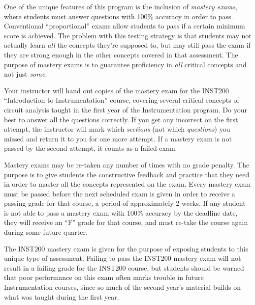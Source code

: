 

One of the unique features of this program is the inclusion of {\it mastery exams}, where students must answer questions with 100\% accuracy in order to pass.  Conventional ``proportional'' exams allow students to pass if a certain minimum score is achieved.  The problem with this testing strategy is that students may not actually learn {\it all} the concepts they're supposed to, but may still pass the exam if they are strong enough in the other concepts covered in that assessment.  The purpose of mastery exams is to guarantee proficiency in {\it all} critical concepts and not just {\it some}.

\vskip 10pt

Your instructor will hand out copies of the mastery exam for the INST200 ``Introduction to Instrumentation'' course, covering several critical concepts of circuit analysis taught in the first year of the Instrumentation program.  Do your best to answer all the questions correctly.  If you get any incorrect on the first attempt, the instructor will mark which {\it sections} (not which {\it questions}) you missed and return it to you for one more attempt.  If a mastery exam is not passed by the second attempt, it counts as a failed exam.

\vskip 10pt

Mastery exams may be re-taken any number of times with no grade penalty.  The purpose is to give students the constructive feedback and practice that they need in order to master all the concepts represented on the exam.  Every mastery exam must be passed before the next scheduled exam is given in order to receive a passing grade for that course, a period of approximately 2 weeks.  If any student is not able to pass a mastery exam with 100\% accuracy by the deadline date, they will receive an ``F'' grade for that course, and must re-take the course again during some future quarter.

\vskip 10pt

The INST200 mastery exam is given for the purpose of exposing students to this unique type of assessment.  Failing to pass the INST200 mastery exam will not result in a failing grade for the INST200 course, but students should be warned that poor performance on this exam often marks trouble in future Instrumentation courses, since so much of the second year's material builds on what was taught during the first year.   %

\vskip 10pt







 










